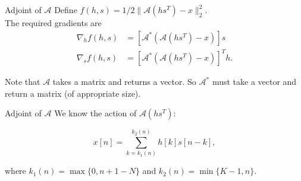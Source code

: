\documentclass[xcolor=dvipsnames,t]{beamer} %
\begin{document}
\begin{frame}{Adjoint of $\mathcal{A}$}
   Define $f(h,s) = 1/2\|\mathcal{A}(hs^T)-x\|_2^2$.\\[.5em]
   
   The required gradients are
   \begin{align*}
      \nabla_h f(h,s) &= \left[\mathcal{A}^\ast(\mathcal{A}(hs^T)-x)\right]s\\
      \nabla_s f(h,s) &= \left[\mathcal{A}^\ast(\mathcal{A}(hs^T)-x)\right]^Th.
   \end{align*}

   Note that $\mathcal{A}$ takes a matrix and returns a vector.  So $\mathcal{A}^\ast$ must take a vector and return a matrix (of appropriate size).\\

\end{frame}

\begin{frame}{Adjoint of $\mathcal{A}$}
   We know the action of $\mathcal{A}(hs^T)$:
      
   \[ x[n] =  \sum_{k=k_1(n)}^{k_2(n)} h[k]s[n-k], \] 

   where $k_1(n) = \max\{0,n+1-N\}$ and $k_2(n) = \min\{K-1,n\}$.

\end{frame}
\end{document}
